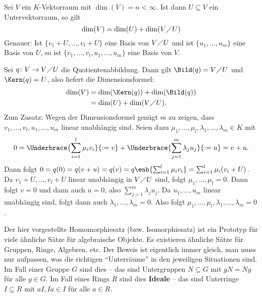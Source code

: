 \begin{satz}
	\label{satz:11.9}
	Sei $V$ ein $K$-Vektorraum mit $\dim(V) = n < \infty$.
	Ist dann $U \subseteq V$ ein Untervektorraum, so gilt
	\[
		\dim(V) = \dim(U) + \dim(V \diagup U)
	\]
	Genauer: Ist $\{v_1+U,\dots,v_l + U\}$ eine Basis von $V \diagup U$ und ist $\{u_1,\dots,u_m\}$ eine Basis von $U$, so ist $\{v_1,\dots,v_l,u_1,\dots,u_m\}$ eine Basis von $V$.
\end{satz}

\begin{beweis}
	Sei $q \colon V \rightarrow V \diagup U$ die Quotientenabbildung.
	Dann gilt $\Bild(q) = V \diagup U$ und $\Kern(q) = U$, also liefert die Dimensionsformel:
	\begin{align*}
		\dim(V) &= \dim(\Kern(q)) + \dim(\Bild(q)) \\
		&= \dim(U) + \dim(V\diagup U).
	\end{align*}
	\newpage
	Zum Zusatz: Wegen der Dimensionsformel genügt es zu zeigen, dass $v_1,\dots,v_l,u_1,\dots,u_m$ linear unabhängig sind.
	Seien dazu $\mu_1,\dots,\mu_l,\lambda_1,\dots,\lambda_m \in K$ mit
	\[
		0 = \Underbrace{\sum_{i=1}^{l} \mu_i v_i}{:= v} + \Underbrace{\sum_{j=1}^{m} \lambda_j u_j}{:= u}  = v + u.
	\]
	Dann folgt $0 = q(0) = q(v+u) = q(v) = q \enb{\sum_{i=1}^{l} \mu_i v_i} = \sum_{i=1}^{l} \mu_i (v_i+U)$.
	Da $v_1+U, \dots, v_l+U$ linear unabhängig in $V \diagup U$ sind, folgt $\mu_1,\dots,\mu_l = 0$.
	Dann folgt $v = 0$ und dann auch $u = 0$, also $\sum_{j=1}^{m} \lambda_j u_j$.
	Da $u_1,\dots,u_m$ linear unabhängig sind, folgt dann auch $\lambda_1,\dots,\lambda_m = 0$.
	Also folgt $\mu_1,\dots,\mu_l,\lambda_1,\dots,\lambda_m = 0$. 
\end{beweis}

\begin{bemerkung}
	\label{bem:11.10}
	Der hier vorgestellte Homomorphiesatz (bzw. Isomorphiesatz) ist ein Prototyp für viele ähnliche Sätze für algebraische Objekte.
	Es existieren ähnliche Sätze für Gruppen, Ringe, Algebren, etc.
	Der Beweis ist eigentlich immer gleich, man muss nur aufpassen, was die richtigen \enquote{Unterräume} in den jeweiligen Situationen sind.
	Im Fall einer Gruppe $G$ sind dies  -- das sind Untergruppen $N \subseteq G$ mit $gN = Ng$ für alle $g \in G$.
	Im Fall eines Rings $R$ sind dies \textbf{Ideale} -- das sind Unterringe $I \subseteq R$ mit $aI, Ia \in I$ für alle $a \in R$. 
\end{bemerkung}

